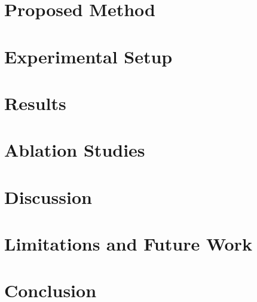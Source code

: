 \documentclass[conference]{IEEEtran}
\begin{document}
\section{Proposed Method}


\section{Experimental Setup}


\section{Results}


\section{Ablation Studies}


\section{Discussion}


\section{Limitations and Future Work}


\section{Conclusion}


%



\end{document}
